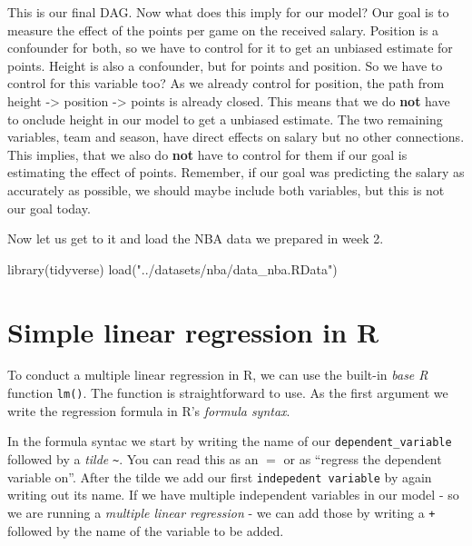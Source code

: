 \documentclass[
]{book}
\newenvironment{Shaded}{\begin{snugshade}}{\end{snugshade}}
\newcommand{\FunctionTok}[1]{\textcolor[rgb]{0.00,0.00,0.00}{#1}}
\newcommand{\FunctionTok}[1]{\textcolor[rgb]{0.13,0.29,0.53}{\textbf{#1}}}
\newcommand{\NormalTok}[1]{#1}
\newcommand{\StringTok}[1]{\textcolor[rgb]{0.31,0.60,0.02}{#1}}
\begin{document}
This is our final DAG. Now what does this imply for our model?
Our goal is to measure the effect of the points per game on the received
salary. Position is a confounder for both, so we have to control for it to get
an unbiased estimate for points. Height is also a confounder, but for points
and position. So we have to control for this variable too? As we already control
for position, the path from height -\textgreater{} position -\textgreater{} points is already closed. This
means that we do \textbf{not} have to onclude height in our model to get a unbiased
estimate. The two remaining variables, team and season, have direct effects on
salary but no other connections. This implies, that we also do \textbf{not} have to
control for them if our goal is estimating the effect of points. Remember, if
our goal was predicting the salary as accurately as possible, we should maybe
include both variables, but this is not our goal today.

Now let us get to it and load the NBA data we prepared in week 2.

\begin{Shaded}
\begin{Highlighting}[]
\FunctionTok{library}\NormalTok{(tidyverse)}
\FunctionTok{load}\NormalTok{(}\StringTok{"../datasets/nba/data\_nba.RData"}\NormalTok{)}
\end{Highlighting}
\end{Shaded}

\hypertarget{simple-linear-regression-in-r}{%
\section{Simple linear regression in R}\label{simple-linear-regression-in-r}}

To conduct a multiple linear regression in R, we can use the built-in \emph{base R}
function \texttt{lm()}. The function is straightforward to use. As the first argument
we write the regression formula in R's \emph{formula syntax}.

In the formula syntac we start by writing the name of our \texttt{dependent\_variable}
followed by a \emph{tilde} \texttt{\textasciitilde{}}. You can read this as an \(=\) or as ``regress the
dependent variable on''. After the tilde we add our first \texttt{indepedent\ variable}
by again writing out its name. If we have multiple independent variables in our
model - so we are running a \emph{multiple linear regression} - we can add those by
writing a \texttt{+} followed by the name of the variable to be added.
\end{document}
